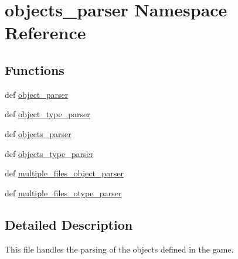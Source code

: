 \hypertarget{namespaceobjects__parser}{\section{objects\-\_\-parser \-Namespace \-Reference}
\label{namespaceobjects__parser}
}
\subsection*{\-Functions}
\begin{DoxyCompactItemize}
\item 
def \hyperlink{namespaceobjects__parser_a644e22cf69be4f9c4d5bdb5391f88704}{object\-\_\-parser}
\item 
def \hyperlink{namespaceobjects__parser_a6db34fdb8d9758d93aebe6d00d83912f}{object\-\_\-type\-\_\-parser}
\item 
def \hyperlink{namespaceobjects__parser_a870c0633694e049ba3cf799697977609}{objects\-\_\-parser}
\item 
def \hyperlink{namespaceobjects__parser_afc8321917c69d971487a5bec30698f6f}{objects\-\_\-type\-\_\-parser}
\item 
def \hyperlink{namespaceobjects__parser_a141baa02fef1e5ae1c4d34dc2cca80e5}{multiple\-\_\-files\-\_\-object\-\_\-parser}
\item 
def \hyperlink{namespaceobjects__parser_ac7e6d19722ae663c3898672a169e01b0}{multiple\-\_\-files\-\_\-otype\-\_\-parser}
\end{DoxyCompactItemize}


\subsection{\-Detailed \-Description}
\begin{DoxyVerb}
This file handles the parsing of the objects defined in the game.
\end{DoxyVerb}
 

